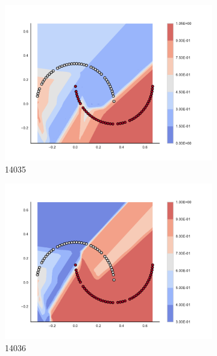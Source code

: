 \begin{figure}[h]
\begin{subfigure}[b]{0.09\textwidth}
    \includegraphics[clip, trim=2.35cm 1.75cm 4.5cm 0cm,width=\textwidth]{img/convergence/14035.pdf}
    \caption{14035}
    \label{fig:convergence_14035}
\end{subfigure}
%
\begin{subfigure}[b]{0.09\textwidth}
    \includegraphics[clip, trim=2.35cm 1.75cm 4.5cm 0cm,width=\textwidth]{img/convergence/14036.pdf}
    \caption{14036}
    \label{fig:convergence_14036}
\end{subfigure}
%
\begin{subfigure}[b]{0.09\textwidth}

\end{subfigure}
\end{figure}
